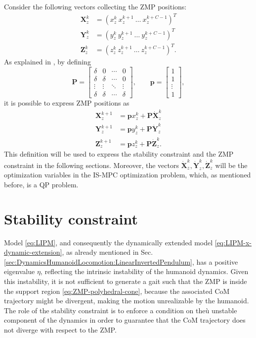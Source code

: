 Consider the following vectors collecting the ZMP positions:
\begin{align}
    \label{eq:ZMP-positions-x-matrix}
    \bm{X}_z^k &= (x_z^k \ x_z^{k+1} \ \dots \ x_z^{k+C-1})^T \\
    \bm{Y}_z^k &= (y_z^k \ y_z^{k+1} \ \dots \ y_z^{k+C-1})^T \\
    \bm{Z}_z^k &= (z_z^k \ z_z^{k+1} \ \dots \ z_z^{k+C-1})^T.
\end{align}
As explained in \cite{Scianca2016ISMPC}, by defining
\begin{equation*}
    \bm{P} =
    \begin{bmatrix}
        \delta & 0 & \cdots & 0 \\
        \delta & \delta & \cdots & 0 \\
        \vdots & \vdots & \ddots & \vdots \\
        \delta & \delta & \cdots & \delta
    \end{bmatrix},
    \qquad
    \bm{p} =
    \begin{bmatrix}
        1 \\ 1 \\ \vdots \\ 1
    \end{bmatrix},
\end{equation*}
it is possible to express ZMP positions as
\begin{align*}
    \bm{X}_z^{k+1} &= \bm{p} x_z^k + \bm{P} \dot{\bm{X}}_z^k \\
    \bm{Y}_z^{k+1} &= \bm{p} y_z^k + \bm{P} \dot{\bm{Y}}_z^k \\
    \bm{Z}_z^{k+1} &= \bm{p} z_z^k + \bm{P} \dot{\bm{Z}}_z^k.
\end{align*}
This definition will be used to express the stability constraint and the
ZMP constraint in the following sections. Moreover, the vectors $\dot{\bm{X}}_z^k,
\dot{\bm{Y}}_z^k, \dot{\bm{Z}}_z^k$ will be the optimization variables in the 
IS-MPC optimization problem, which, as mentioned before, is a QP problem.

\section{Stability constraint}
Model \eqref{eq:LIPM}, and consequently the dynamically extended model
\eqref{eq:LIPM-x-dynamic-extension}, as already mentioned in Sec.
\ref{sec:DynamicsHumanoidLocomotion:LinearInvertedPendulum}, has a positive
eigenvalue $\eta$, reflecting the intrinsic instability of the humanoid dynamics.
Given this instability, it is not sufficient to generate a gait such that
the ZMP is inside the support region \eqref{eq:ZMP-polyhedral-cone},
because the associated CoM trajectory might be divergent,
making the motion unrealizable by the humanoid.
The role of the stability constraint is to enforce a condition on theù
unstable component of the dynamics in order to guarantee that the CoM
trajectory does not diverge with respect to the ZMP.

